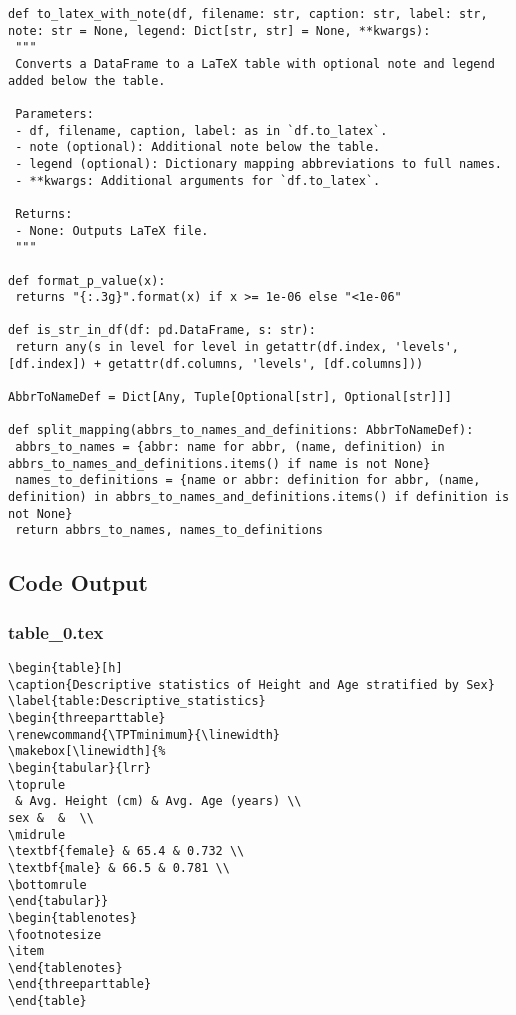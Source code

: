 \documentclass[11pt]{article}
\begin{document}
\begin{verbatim}
def to_latex_with_note(df, filename: str, caption: str, label: str, note: str = None, legend: Dict[str, str] = None, **kwargs):
 """
 Converts a DataFrame to a LaTeX table with optional note and legend added below the table.

 Parameters:
 - df, filename, caption, label: as in `df.to_latex`.
 - note (optional): Additional note below the table.
 - legend (optional): Dictionary mapping abbreviations to full names.
 - **kwargs: Additional arguments for `df.to_latex`.

 Returns:
 - None: Outputs LaTeX file.
 """

def format_p_value(x):
 returns "{:.3g}".format(x) if x >= 1e-06 else "<1e-06"

def is_str_in_df(df: pd.DataFrame, s: str):
 return any(s in level for level in getattr(df.index, 'levels', [df.index]) + getattr(df.columns, 'levels', [df.columns]))

AbbrToNameDef = Dict[Any, Tuple[Optional[str], Optional[str]]]

def split_mapping(abbrs_to_names_and_definitions: AbbrToNameDef):
 abbrs_to_names = {abbr: name for abbr, (name, definition) in abbrs_to_names_and_definitions.items() if name is not None}
 names_to_definitions = {name or abbr: definition for abbr, (name, definition) in abbrs_to_names_and_definitions.items() if definition is not None}
 return abbrs_to_names, names_to_definitions

\end{verbatim}



\subsection{Code Output}

\subsubsection*{table\_0.tex}

\begin{Verbatim}[tabsize=4]
\begin{table}[h]
\caption{Descriptive statistics of Height and Age stratified by Sex}
\label{table:Descriptive_statistics}
\begin{threeparttable}
\renewcommand{\TPTminimum}{\linewidth}
\makebox[\linewidth]{%
\begin{tabular}{lrr}
\toprule
 & Avg. Height (cm) & Avg. Age (years) \\
sex &  &  \\
\midrule
\textbf{female} & 65.4 & 0.732 \\
\textbf{male} & 66.5 & 0.781 \\
\bottomrule
\end{tabular}}
\begin{tablenotes}
\footnotesize
\item
\end{tablenotes}
\end{threeparttable}
\end{table}

\end{Verbatim}
\end{document}
